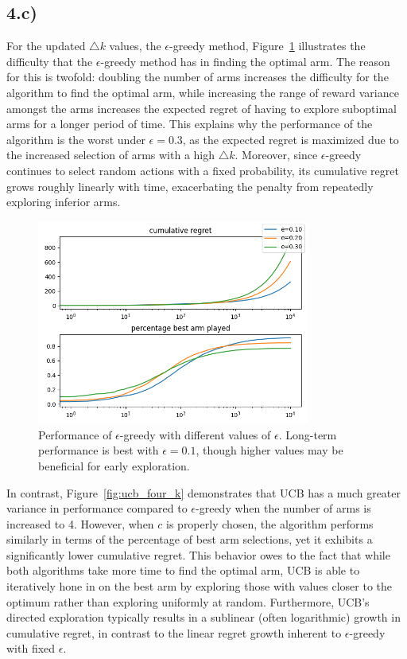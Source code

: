 \documentclass[11pt]{article}
\begin{document}
\newpage
\subsection*{4.c)}
For the updated $\bigtriangleup k$ values, the $\epsilon$-greedy method, Figure~\ref{fig:epsilon_four_k} illustrates the difficulty that the $\epsilon$-greedy method
has in finding the optimal arm. The reason for this is twofold: doubling the number of arms increases the difficulty for the algorithm to find the optimal arm,
while increasing the range of reward variance amongst the arms increases the expected regret of having to explore suboptimal arms for a longer period of time.
This explains why the performance of the algorithm is the worst under $\epsilon = 0.3$, as the expected regret is maximized due to the increased selection
of arms with a high $\bigtriangleup k$. Moreover, since $\epsilon$-greedy continues to select random actions with a fixed probability,
its cumulative regret grows roughly linearly with time, exacerbating the penalty from repeatedly exploring inferior arms.

\begin{figure}[htbp]
\centering
\includegraphics[width=0.8\textwidth]{images/Figure_6.png}
\caption{Performance of $\epsilon$-greedy with different values of $\epsilon$. Long-term performance is best with $\epsilon = 0.1$, though higher values may be beneficial for early exploration.}
\label{fig:epsilon_four_k}
\end{figure}

\newpage
In contrast, Figure~\ref{fig:ucb_four_k} demonstrates that UCB has a much greater variance in performance compared to $\epsilon$-greedy when the number of arms is increased to 4.
However, when $c$ is properly chosen, the algorithm performs similarly in terms of the percentage of best arm selections,
yet it exhibits a significantly lower cumulative regret. This behavior owes to the fact that while both algorithms take more time to find the optimal arm,
UCB is able to iteratively hone in on the best arm by exploring those with values closer to the optimum rather than exploring uniformly at random.
Furthermore, UCB’s directed exploration typically results in a sublinear (often logarithmic) growth in cumulative regret, in contrast to the
linear regret growth inherent to $\epsilon$-greedy with fixed $\epsilon$.
\end{document}
